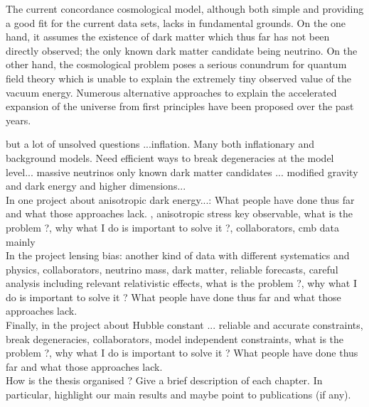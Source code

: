 The current concordance cosmological model, although both simple and providing a good fit for the current data sets, lacks in fundamental grounds. On the one hand, it assumes the existence of dark matter which thus far has not been directly observed; the only known dark matter candidate being neutrino. On the other hand, the cosmological problem poses a serious conundrum for quantum field theory which is unable to explain the extremely tiny observed value of the vacuum energy. Numerous alternative approaches to explain the accelerated expansion of the universe from first principles have been proposed over the past years. 

 but a lot of unsolved questions ...inflation. Many both inflationary and background models. 
Need efficient ways to break degeneracies at the model level... massive neutrinos only known dark matter candidates ... modified gravity and dark energy and higher dimensions...   \\

In one project about anisotropic dark energy...: What people have done thus far and what those approaches lack.  , anisotropic stress key observable, what is the problem ?, why what I do is important to solve it ?, collaborators, cmb data mainly\\

In the project lensing bias: another kind of data with different systematics and physics, collaborators, neutrino mass, dark matter, reliable forecasts, careful analysis including relevant relativistic effects, what is the problem ?, why what I do is important to solve it ? What people have done thus far and what those approaches lack.  \\

Finally, in the project about Hubble constant ... reliable and accurate constraints, break degeneracies, collaborators, model independent constraints, what is the problem ?, why what I do is important to solve it ? What people have done thus far and what those approaches lack.  \\ 

How is the thesis organised ? Give a brief description of each chapter. In particular, highlight our main results and maybe point to publications (if any).


 
